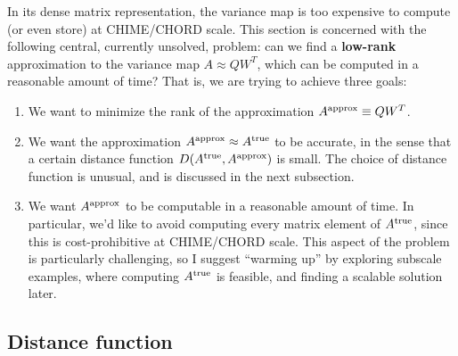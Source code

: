 \documentclass{article}
\numberwithin{equation}{section}   %
\begin{document}
In its dense matrix representation, the variance map is too expensive to compute (or even store)
at CHIME/CHORD scale.
This section is concerned with the following central, currently unsolved, problem:
can we find a {\bf low-rank} approximation to the variance map $A \approx QW^T$, which can be computed
in a reasonable amount of time?
That is, we are trying to achieve three goals:
\begin{enumerate}
\item We want to minimize the rank of the approximation $A^{\rm approx} \equiv QW^T$.
\item We want the approximation $A^{\rm approx} \approx A^{\rm true}$ to be accurate,
 in the sense that a certain distance function $D(A^{\rm true}, A^{\rm approx})$ is
 small. The choice of distance function is unusual, and is discussed in the next subsection.
\item We want $A^{\rm approx}$ to be computable in a reasonable amount of time.
 In particular, we'd like to avoid computing every matrix element of $A^{\rm true}$,
 since this is cost-prohibitive at CHIME/CHORD scale.
 This aspect of the problem is particularly challenging, so I suggest ``warming up'' by
 exploring subscale examples, where computing $A^{\rm true}$ is feasible, and finding
 a scalable solution later.
\end{enumerate}

\subsection{Distance function}
\label{ssec:distance_function}
\end{document}
